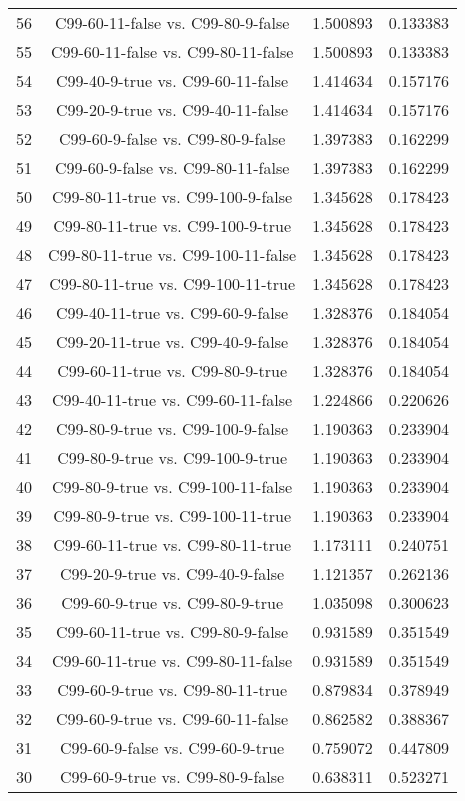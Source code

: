 \documentclass[a4paper,10pt]{article}
\begin{document}
\begin{landscape}
\begin{table}[!htp]
\begin{tabular}{cccc}
56&C99-60-11-false vs. C99-80-9-false&1.500893&0.133383\\
55&C99-60-11-false vs. C99-80-11-false&1.500893&0.133383\\
54&C99-40-9-true vs. C99-60-11-false&1.414634&0.157176\\
53&C99-20-9-true vs. C99-40-11-false&1.414634&0.157176\\
52&C99-60-9-false vs. C99-80-9-false&1.397383&0.162299\\
51&C99-60-9-false vs. C99-80-11-false&1.397383&0.162299\\
50&C99-80-11-true vs. C99-100-9-false&1.345628&0.178423\\
49&C99-80-11-true vs. C99-100-9-true&1.345628&0.178423\\
48&C99-80-11-true vs. C99-100-11-false&1.345628&0.178423\\
47&C99-80-11-true vs. C99-100-11-true&1.345628&0.178423\\
46&C99-40-11-true vs. C99-60-9-false&1.328376&0.184054\\
45&C99-20-11-true vs. C99-40-9-false&1.328376&0.184054\\
44&C99-60-11-true vs. C99-80-9-true&1.328376&0.184054\\
43&C99-40-11-true vs. C99-60-11-false&1.224866&0.220626\\
42&C99-80-9-true vs. C99-100-9-false&1.190363&0.233904\\
41&C99-80-9-true vs. C99-100-9-true&1.190363&0.233904\\
40&C99-80-9-true vs. C99-100-11-false&1.190363&0.233904\\
39&C99-80-9-true vs. C99-100-11-true&1.190363&0.233904\\
38&C99-60-11-true vs. C99-80-11-true&1.173111&0.240751\\
37&C99-20-9-true vs. C99-40-9-false&1.121357&0.262136\\
36&C99-60-9-true vs. C99-80-9-true&1.035098&0.300623\\
35&C99-60-11-true vs. C99-80-9-false&0.931589&0.351549\\
34&C99-60-11-true vs. C99-80-11-false&0.931589&0.351549\\
33&C99-60-9-true vs. C99-80-11-true&0.879834&0.378949\\
32&C99-60-9-true vs. C99-60-11-false&0.862582&0.388367\\
31&C99-60-9-false vs. C99-60-9-true&0.759072&0.447809\\
30&C99-60-9-true vs. C99-80-9-false&0.638311&0.523271\\

\end{tabular}
\end{table}
\end{landscape}
\end{document}
